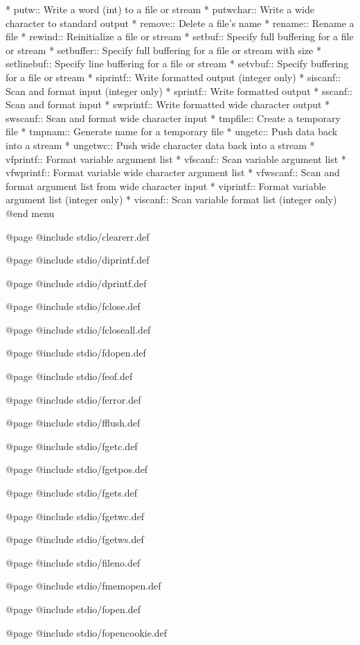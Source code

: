 * putw::        Write a word (int) to a file or stream
* putwchar::    Write a wide character to standard output
* remove::      Delete a file's name
* rename::      Rename a file
* rewind::      Reinitialize a file or stream
* setbuf::      Specify full buffering for a file or stream
* setbuffer::   Specify full buffering for a file or stream with size
* setlinebuf::  Specify line buffering for a file or stream
* setvbuf::     Specify buffering for a file or stream
* siprintf::    Write formatted output (integer only)
* siscanf::     Scan and format input (integer only)
* sprintf::     Write formatted output
* sscanf::      Scan and format input
* swprintf::    Write formatted wide character output
* swscanf::     Scan and format wide character input
* tmpfile::     Create a temporary file
* tmpnam::      Generate name for a temporary file
* ungetc::      Push data back into a stream
* ungetwc::     Push wide character data back into a stream
* vfprintf::    Format variable argument list
* vfscanf::     Scan variable argument list
* vfwprintf::   Format variable wide character argument list
* vfwscanf::    Scan and format argument list from wide character input
* viprintf::    Format variable argument list (integer only)
* viscanf::     Scan variable format list (integer only)
@end menu

@page
@include stdio/clearerr.def

@page
@include stdio/diprintf.def

@page
@include stdio/dprintf.def

@page
@include stdio/fclose.def

@page
@include stdio/fcloseall.def

@page
@include stdio/fdopen.def

@page
@include stdio/feof.def

@page
@include stdio/ferror.def

@page
@include stdio/fflush.def

@page
@include stdio/fgetc.def

@page
@include stdio/fgetpos.def

@page
@include stdio/fgets.def

@page
@include stdio/fgetwc.def

@page
@include stdio/fgetws.def

@page
@include stdio/fileno.def

@page
@include stdio/fmemopen.def

@page
@include stdio/fopen.def

@page
@include stdio/fopencookie.def


